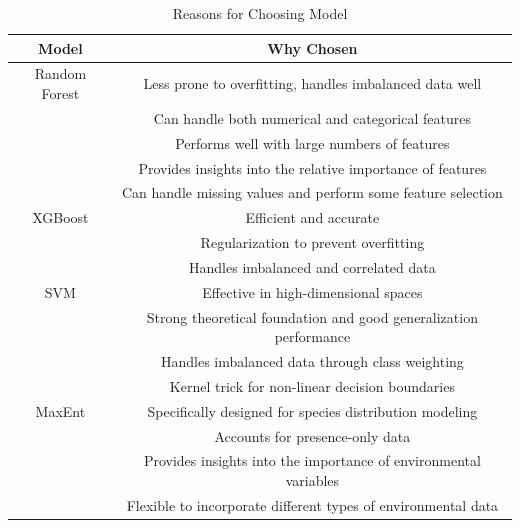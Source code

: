 \documentclass{article}
\begin{document}
\begin{table}[H]
    \centering
    \begin{tabular}{|c|c|}
\hline 
 Model& Why Chosen\\ \hline 

         Random Forest&  Less prone to overfitting, handles imbalanced data well

\\&Can handle both numerical and categorical features

\\&Performs well with large numbers of features

\\&Provides insights into the relative importance of features

\\&Can handle missing values and perform some feature selection\\ \hline 
         XGBoost&  Efficient and accurate
\\&Regularization to prevent overfitting
\\&Handles imbalanced and correlated data\\ \hline 
         SVM &  Effective in high-dimensional spaces
\\&Strong theoretical foundation and good generalization performance
\\&Handles imbalanced data through class weighting\\&Kernel trick for non-linear decision boundaries\\ \hline 
         MaxEnt &  Specifically designed for species distribution modeling
\\&Accounts for presence-only data\\&Provides insights into the importance of environmental variables
\\&Flexible to incorporate different types of environmental data\\ \hline
    \end{tabular}
    \caption{Reasons for Choosing Model}
    \label{tab:Reasons for Choosing Model}
\end{table}

\end{document}
